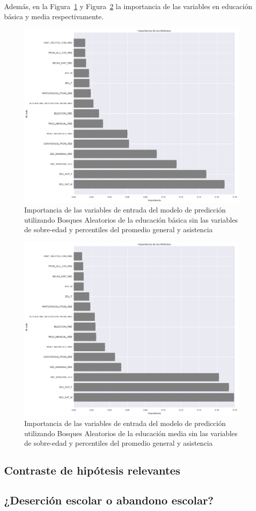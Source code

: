 Además, en la Figura~\ref{fig:impo-basica} y Figura~\ref{fig:impo-media} la importancia de las variables en educación básica y media respectivamente.

\begin{figure}[H]
  \centering
    \includegraphics[trim=0cm 0cm 0cm 0cm,scale=0.4]{Figuras/7AnalisisResultado/impo-basica.png}
      \caption{Importancia de las variables de entrada del modelo de predicción utilizando Bosques Aleatorios de la educación básica sin las variables de sobre-edad y percentiles del promedio general y asistencia}
    \label{fig:impo-basica}
\end{figure}

\begin{figure}[H]
  \centering
    \includegraphics[trim=0cm 0cm 0cm 0cm,scale=0.4]{Figuras/7AnalisisResultado/impo-media.png}
      \caption{Importancia de las variables de entrada del modelo de predicción utilizando Bosques Aleatorios de la educación media sin las variables de sobre-edad y percentiles del promedio general y asistencia}
    \label{fig:impo-media}
\end{figure}

\subsection{Contraste de hipótesis relevantes}
\subsection{¿Deserción escolar o abandono escolar?}